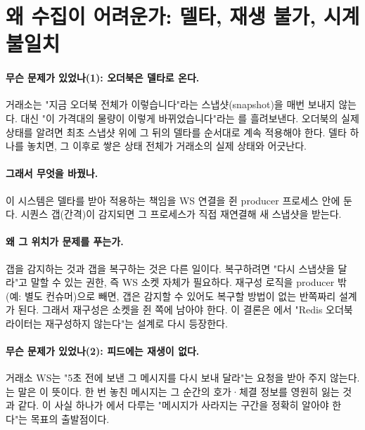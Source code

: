 \section{왜 수집이 어려운가: 델타, 재생 불가, 시계 불일치}
\label{sec:problem-hard}

\paragraph{무슨 문제가 있었나(1): 오더북은 델타로 온다.} 거래소는 "지금 오더북 전체가
이렇습니다"라는 스냅샷(snapshot)을 매번 보내지 않는다. 대신 "이 가격대의 물량이
이렇게 바뀌었습니다"라는 를 흘려보낸다. 오더북의 실제 상태를
알려면 최초 스냅샷 위에 그 뒤의 델타를 순서대로 계속 적용해야 한다. 델타 하나를 놓치면,
그 이후로 쌓은 상태 전체가 거래소의 실제 상태와 어긋난다.

\paragraph{그래서 무엇을 바꿨나.} 이 시스템은 델타를 받아 적용하는  책임을 WS 연결을 쥔 producer 프로세스 안에 둔다. 시퀀스 갭(간격)이
감지되면 그 프로세스가 직접 재연결해 새 스냅샷을 받는다.

\paragraph{왜 그 위치가 문제를 푸는가.} 갭을 감지하는 것과 갭을 복구하는 것은 다른
일이다. 복구하려면 "다시 스냅샷을 달라"고 말할 수 있는 권한, 즉 WS 소켓 자체가 필요하다.
재구성 로직을 producer 밖(예: 별도 컨슈머)으로 빼면, 갭은 감지할 수 있어도 복구할
방법이 없는 반쪽짜리 설계가 된다. 그래서 재구성은 소켓을 쥔 쪽에 남아야 한다.
이 결론은 에서 "Redis 오더북 라이터는 재구성하지 않는다"는
설계로 다시 등장한다.

\paragraph{무슨 문제가 있었나(2): 피드에는 재생이 없다.} 거래소 WS는 "5초 전에 보낸
그 메시지를 다시 보내 달라"는 요청을 받아 주지 않는다. 는
말은 이 뜻이다. 한 번 놓친 메시지는 그 순간의 호가·체결 정보를 영원히 잃는 것과
같다. 이 사실 하나가 에서 다루는 "메시지가 사라지는 구간을 정확히
알아야 한다"는 목표의 출발점이다.

